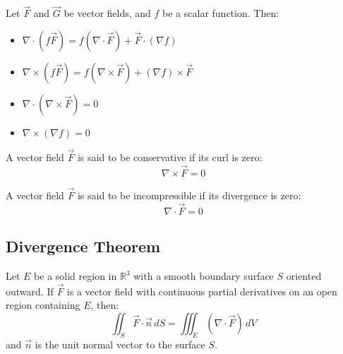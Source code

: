 \documentclass[11pt]{report}
\begin{document}
\begin{theorem}
    Let \(\vec{F}\) and \(\vec{G}\) be vector fields, and \(f\) be a scalar function. Then:
    \begin{itemize}
        \item \(\nabla \cdot (f \vec{F}) = f (\nabla \cdot \vec{F}) + \vec{F} \cdot (\nabla f)\)
        \item \(\nabla \times (f \vec{F}) = f (\nabla \times \vec{F}) + (\nabla f) \times \vec{F}\)
        \item \(\nabla \cdot (\nabla \times \vec{F}) = 0\)
        \item \(\nabla \times (\nabla f) = 0\)
    \end{itemize}
\end{theorem}

\begin{definition}
    A vector field \(\vec{F}\) is said to be conservative if its curl is zero:
    \begin{equation}
        \nabla \times \vec{F} = 0
    \end{equation}
    
\end{definition}

\begin{definition}
    A vector field \(\vec{F}\) is said to be incompressible if its divergence is zero:
    \begin{equation}
        \nabla \cdot \vec{F} = 0
    \end{equation}
    
\end{definition}

\subsection{Divergence Theorem}
\begin{theorem}
    Let \(E\) be a solid region in \(\mathbb{R}^3\) with a smooth boundary surface \(S\) oriented outward. If \(\vec{F}\) is a vector field with continuous partial derivatives on an open region containing \(E\), then:
    \begin{equation}
        \iint_S \vec{F} \cdot \vec{n} \, dS = \iiint_E (\nabla \cdot \vec{F}) \, dV
    \end{equation}
    and $\vec{n}$ is the unit normal vector to the surface \(S\).
\end{theorem}
\end{document}
